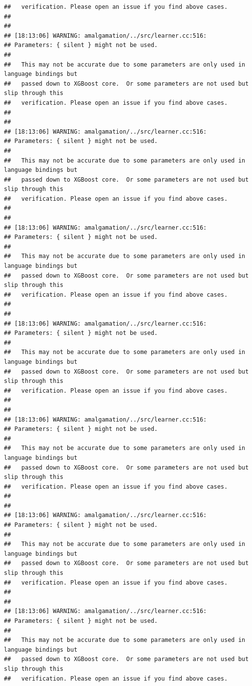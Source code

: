 \documentclass[AMS,STIX2COL]{WileyNJD-v2}\usepackage[]{graphicx}\usepackage[]{color}
\makeatletter
\newenvironment{kframe}{%
 \def\at@end@of@kframe{}%
 \ifinner\ifhmode%
  \def\at@end@of@kframe{\end{minipage}}%
  \begin{minipage}{\columnwidth}%
 \fi\fi%
 \def\FrameCommand##1{\hskip\@totalleftmargin \hskip-\fboxsep
 \colorbox{shadecolor}{##1}\hskip-\fboxsep
     \hskip-\linewidth \hskip-\@totalleftmargin \hskip\columnwidth}%
 \MakeFramed {\advance\hsize-\width
   \@totalleftmargin\z@ \linewidth\hsize
   \@setminipage}}%
 {\par\unskip\endMakeFramed%
 \at@end@of@kframe}
\newenvironment{knitrout}{}{} %
\makeatother
\begin{document}
\begin{knitrout}
\begin{kframe}
\begin{verbatim}
##   verification. Please open an issue if you find above cases.
## 
## 
## [18:13:06] WARNING: amalgamation/../src/learner.cc:516: 
## Parameters: { silent } might not be used.
## 
##   This may not be accurate due to some parameters are only used in language bindings but
##   passed down to XGBoost core.  Or some parameters are not used but slip through this
##   verification. Please open an issue if you find above cases.
## 
## 
## [18:13:06] WARNING: amalgamation/../src/learner.cc:516: 
## Parameters: { silent } might not be used.
## 
##   This may not be accurate due to some parameters are only used in language bindings but
##   passed down to XGBoost core.  Or some parameters are not used but slip through this
##   verification. Please open an issue if you find above cases.
## 
## 
## [18:13:06] WARNING: amalgamation/../src/learner.cc:516: 
## Parameters: { silent } might not be used.
## 
##   This may not be accurate due to some parameters are only used in language bindings but
##   passed down to XGBoost core.  Or some parameters are not used but slip through this
##   verification. Please open an issue if you find above cases.
## 
## 
## [18:13:06] WARNING: amalgamation/../src/learner.cc:516: 
## Parameters: { silent } might not be used.
## 
##   This may not be accurate due to some parameters are only used in language bindings but
##   passed down to XGBoost core.  Or some parameters are not used but slip through this
##   verification. Please open an issue if you find above cases.
## 
## 
## [18:13:06] WARNING: amalgamation/../src/learner.cc:516: 
## Parameters: { silent } might not be used.
## 
##   This may not be accurate due to some parameters are only used in language bindings but
##   passed down to XGBoost core.  Or some parameters are not used but slip through this
##   verification. Please open an issue if you find above cases.
## 
## 
## [18:13:06] WARNING: amalgamation/../src/learner.cc:516: 
## Parameters: { silent } might not be used.
## 
##   This may not be accurate due to some parameters are only used in language bindings but
##   passed down to XGBoost core.  Or some parameters are not used but slip through this
##   verification. Please open an issue if you find above cases.
## 
## 
## [18:13:06] WARNING: amalgamation/../src/learner.cc:516: 
## Parameters: { silent } might not be used.
## 
##   This may not be accurate due to some parameters are only used in language bindings but
##   passed down to XGBoost core.  Or some parameters are not used but slip through this
##   verification. Please open an issue if you find above cases.

\end{verbatim}
\end{kframe}
\end{knitrout}
\end{document}
